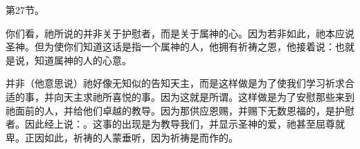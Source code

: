 第27节。\par

你们看，祂所说的并非关于护慰者，而是关于属神的心。因为若非如此，祂本应说圣神。但为使你们知道这话是指一个属神的人，他拥有祈祷之恩，他接着说：也就是说，知道属神的人的心意。\par

\par

并非（他意思说）祂好像无知似的告知天主，而是这样做是为了使我们学习祈求合适的事，并向天主求祂所喜悦的事。因为这就是所谓。这样做是为了安慰那些来到祂面前的人，并给他们卓越的教导。因为那供应恩赐，并赐下无数恩福的，是护慰者。因此经上说：。这事的出现是为教导我们，并显示圣神的爱，祂甚至屈尊就卑。正因如此，祈祷的人蒙垂听，因为祈祷是而作的。\par

